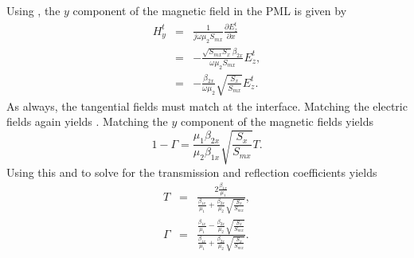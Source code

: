 Using , the $y$ component of the magnetic field in
the PML is given by
\begin{eqnarray}
  H_y^t &=& \frac{1}{j\omega\mu_2 S_{mx}}
          \frac{\partial E_z^t}{\partial x} \\
        &=& -\frac{\sqrt{S_{mx}S_x}\beta_{2x}}{\omega\mu_2 S_{mx}} E_z^t, \\
        &=& -\frac{\beta_{2x}}{\omega\mu_2}
             \sqrt{\frac{S_x}{S_{mx}}} E_z^t.
\end{eqnarray}
As always, the tangential fields must match at the interface.
Matching the electric fields again yields
.  Matching the $y$ component of the
magnetic fields yields
\begin{equation}
  1 - \Gamma = \frac{\mu_1 \beta_{2x}}{\mu_2 \beta_{1x}}
               \sqrt{\frac{S_x}{S_{mx}}} T.
\end{equation}
Using this and  to solve for the
transmission and reflection coefficients yields
\begin{eqnarray}
  T &=& \frac{2\frac{\beta_{1x}}{\mu_1}}
           {\frac{\beta_{1x}}{\mu_1} + \frac{\beta_{2x}}{\mu_2}
               \sqrt{\frac{S_x}{S_{mx}}}}, \\
  \Gamma &=&  \frac{\frac{\beta_{1x}}{\mu_1} - \frac{\beta_{2x}}{\mu_2}
               \sqrt{\frac{S_x}{S_{mx}}}}
           {\frac{\beta_{1x}}{\mu_1} + \frac{\beta_{2x}}{\mu_2}
               \sqrt{\frac{S_x}{S_{mx}}}}.
  \label{eq:gPml2D}
\end{eqnarray}

